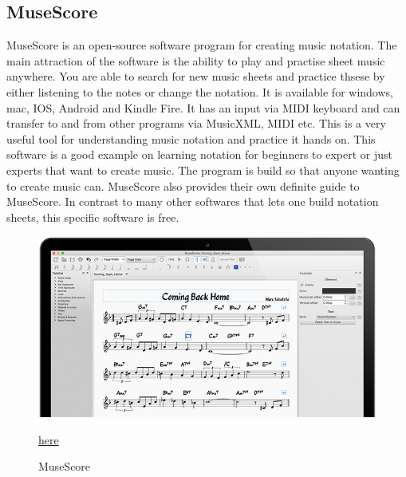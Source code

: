 	\subsection{MuseScore}
	MuseScore is an open-source software program for creating music notation. The main attraction of the software is the ability to play and practise sheet music anywhere. You are able to search for new music sheets and practice thsese by either listening to the notes or change the notation. It is available for windows, mac, IOS, Android and Kindle Fire. It has an input via MIDI keyboard and can transfer to and from other programs via MusicXML, MIDI etc. This is a very useful tool for understanding music notation and practice it hands on. This software is a good example on learning notation for beginners to expert or just experts that want to create music. The program is build so that anyone wanting to create music can. MuseScore also provides their own definite guide to MuseScore. In contrast to many other softwares that lets one build notation sheets, this specific software is free. 
	
		\begin{figure}[H]
			\centering
			\includegraphics[width=0.8\linewidth]{figure/Analysis/musescore.png}
			\label{fig:MuseScore}
			\caption{MuseScore}
			\href{https://musescore.org/da}{\color{blue}here}
		\end{figure}
	
	
	
	
	
	
	
	
















		